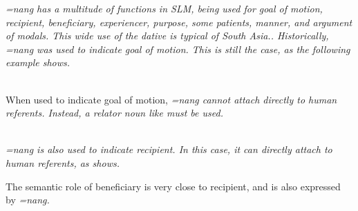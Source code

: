 
\em =nang \em has a multitude of functions in SLM, being used for goal of motion, recipient, beneficiary, experiencer, purpose, some patients, manner, and argument of modals. This wide use of the dative is typical of South Asia.\citep{Masica1976, Sridhar1976cls,Sridhar1976sils,Sridhar1979,VermaEtAlEd1990,BhaskararaoEtAlEd2004I,BhaskararaoEtAlEd2004II}.
Historically, \em =nang \em was used to indicate goal of motion. This is still the case, as the following example shows.
  
\\ 


When used to indicate goal of motion, \em =nang \em cannot attach directly to human referents. Instead, a relator noun like  must be used.
  
\\ 
  
\em =nang \em is also used to indicate recipient. In this case, it can directly attach to human referents, as  shows.


The semantic role of beneficiary is very close to recipient, and is also expressed by \em =nang\em.


\\ 


